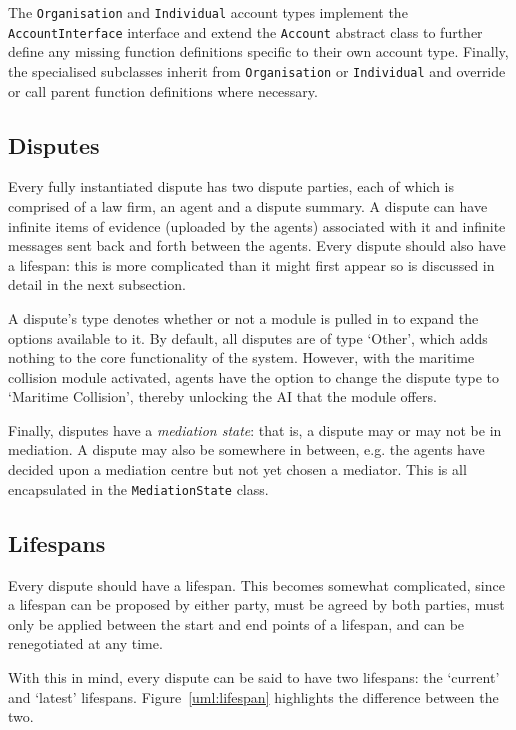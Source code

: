 The \lstinline{Organisation} and \lstinline{Individual} account types implement the \lstinline{AccountInterface} interface and extend the \lstinline{Account} abstract class to further define any missing function definitions specific to their own account type. Finally, the specialised subclasses inherit from \lstinline{Organisation} or \lstinline{Individual} and override or call parent function definitions where necessary.

\subsection{Disputes}

Every fully instantiated dispute has two dispute parties, each of which is comprised of a law firm, an agent and a dispute summary. A dispute can have infinite items of evidence (uploaded by the agents) associated with it and infinite messages sent back and forth between the agents. Every dispute should also have a lifespan: this is more complicated than it might first appear so is discussed in detail in the next subsection.

A dispute's type denotes whether or not a module is pulled in to expand the options available to it. By default, all disputes are of type `Other', which adds nothing to the core functionality of the system. However, with the maritime collision module activated, agents have the option to change the dispute type to `Maritime Collision', thereby unlocking the AI that the module offers.

Finally, disputes have a \emph{mediation state}: that is, a dispute may or may not be in mediation. A dispute may also be somewhere in between, e.g. the agents have decided upon a mediation centre but not yet chosen a mediator. This is all encapsulated in the \lstinline{MediationState} class.

\subsection{Lifespans}

Every dispute should have a lifespan. This becomes somewhat complicated, since a lifespan can be proposed by either party, must be agreed by both parties, must only be applied between the start and end points of a lifespan, and can be renegotiated at any time.

With this in mind, every dispute can be said to have two lifespans: the `current' and `latest' lifespans. Figure~\ref{uml:lifespan} highlights the difference between the two.

